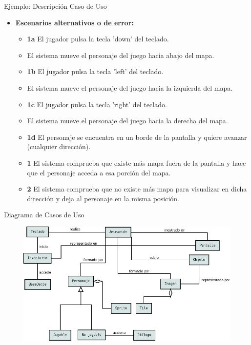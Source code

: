 \documentclass[9pt,xcolor=svgnames]{beamer}
\begin{document}
  
  \begin{frame}{Ejemplo: Descripción Caso de Uso}
   \begin{itemize}
    
    \item \textbf{Escenarios alternativos o de error:} \\
	  \begin{itemize}
	   \item \textbf{1a} El jugador pulsa la tecla 'down' del teclado.
	   \item \textbf{  } El sistema mueve el personaje del juego
		 hacia abajo del mapa.
	   \item \textbf{1b} El jugador pulsa la tecla 'left' del teclado.
	   \item \textbf{  } El sistema mueve el personaje del juego
		 hacia la izquierda del mapa.
	   \item \textbf{1c} El jugador pulsa la tecla 'right' del teclado.
	   \item \textbf{  } El sistema mueve el personaje del juego
		 hacia la derecha del mapa.
	   \item \textbf{1d} El personaje se encuentra en un borde de la
		 pantalla y quiere avanzar (cualquier dirección).
	   \item \textbf{ 1} El sistema comprueba que existe más mapa
		 fuera de la pantalla y hace que el personaje acceda a
		 esa porción del mapa.
	   \item \textbf{ 2} El sistema comprueba que no existe más mapa
		 para visualizar en dicha dirección y deja al personaje
		 en la misma posición.
	  \end{itemize}
   \end{itemize}
   
   
  \end{frame}
  
  
  
  \begin{frame}{Diagrama de Casos de Uso}
   \begin{figure}[t]
    \includegraphics[scale=0.34]{./Imagenes/Diagrama_conceptual.png}
   \end{figure}
  \end{frame}
  
\end{document}
